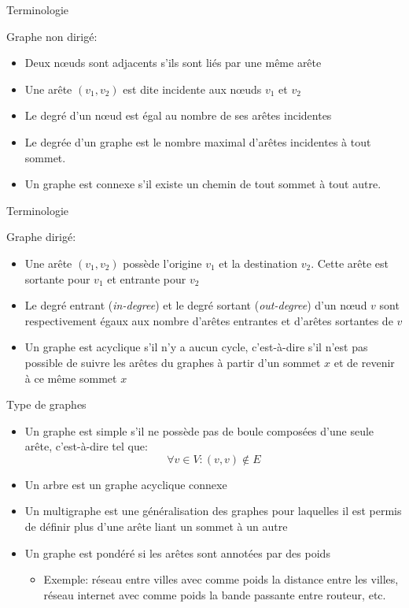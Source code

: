 \begin{frame}{Terminologie}

Graphe non dirigé:
\begin{itemize}
\item Deux n\oe uds sont \alert{adjacents} s'ils sont liés par une même arête
\item Une arête $(v_1,v_2)$ est dite \alert{incidente} aux n\oe uds $v_1$ et $v_2$
\item Le \alert{degré} d'un n\oe ud est égal au nombre de ses arêtes incidentes
\item Le \alert{degrée d'un graphe} est le nombre maximal d'arêtes incidentes à tout sommet.
\item Un graphe est \alert{connexe} s'il existe un chemin de tout sommet à tout autre.
\end{itemize}

\end{frame}

\begin{frame}{Terminologie}

Graphe dirigé:
\begin{itemize}
\item Une arête $(v_1,v_2)$ possède l'\alert{origine} $v_1$ et la \alert{destination}
  $v_2$. Cette arête est \alert{sortante} pour $v_1$ et \alert{entrante} pour $v_2$
\item Le degré \alert{entrant} ({\it in-degree}) et le degré \alert{sortant}
  ({\it out-degree}) d'un n\oe ud $v$ sont respectivement égaux aux nombre d'arêtes entrantes et d'arêtes sortantes de $v$
\item Un graphe est \alert{acyclique} s'il n'y a aucun cycle, c'est-à-dire
  s'il n'est pas possible de suivre les arêtes du graphes à partir
  d'un sommet $x$ et de revenir à ce même sommet $x$
\end{itemize}

\end{frame}

\begin{frame}{Type de graphes}
\begin{itemize}
\item Un graphe est \alert{simple} s'il ne possède pas de boule composées d'une seule arête, c'est-à-dire tel que:
$$\forall v \in V: (v,v)\notin E$$
\item Un \alert{arbre} est un graphe acyclique connexe
\item Un \alert{multigraphe} est une généralisation des graphes pour laquelles
  il est permis de définir plus d'une arête liant un sommet à un autre

\bigskip

\item Un graphe est \alert{pondéré} si les arêtes sont annotées par des \alert{poids}
\begin{itemize}
\item Exemple: réseau entre villes avec comme poids la distance entre
  les villes, réseau internet avec comme poids la bande passante entre routeur, etc.
\end{itemize}
\end{itemize}
\end{frame}

